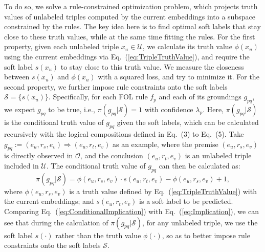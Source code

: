 \documentclass[letterpaper]{article} \usepackage{aaai18}  \usepackage{times}  \usepackage{helvet}  \usepackage{courier}  \usepackage{url}  \usepackage{graphicx}  \usepackage{amsmath}
\begin{document}
To do so, we solve a rule-constrained optimization problem, which projects truth values of unlabeled triples computed by the current embeddings into a subspace constrained by the rules. The key idea here is to find optimal soft labels that stay close to these truth values, while at the same time fitting the rules. For the first property, given each unlabeled triple $x_u\in\mathcal{U}$, we calculate its truth value $\phi(x_u)$ using the current embeddings via Eq.~(\ref{eq:TripleTruthValue}), and require the soft label $s(x_u)$ to stay close to this truth value. We measure the closeness between $s(x_u)$ and $\phi(x_u)$ with a squared loss, and try to minimize it. For the second property, we further impose rule constraints onto the soft labels $\mathcal{S}=\{s(x_u)\}$. Specifically, for each FOL rule $f_p$ and each of its groundings $g_{pq}$, we expect $g_{pq}$ to be true, i.e., $\pi(g_{pq}|\mathcal{S})\!=\!1$ with confidence $\lambda_p$. Here, $\pi(g_{pq}|\mathcal{S})$ is the conditional truth value of $g_{pq}$ given the soft labels, which can be calculated recursively with the logical compositions defined in Eq.~(3) to Eq.~(5). Take $g_{pq}:=(e_u, r_s, e_v) \Rightarrow (e_u, r_t, e_v)$ as an example, where the premise $(e_u, r_s, e_v)$ is directly observed in $\mathcal{O}$, and the conclusion $(e_u, r_t, e_v)$ is an unlabeled triple included in $\mathcal{U}$. The conditional truth value of $g_{pq}$ can then be calculated as:
\begin{equation}\label{eq:ConditionalImplication}
\pi(g_{pq}|\mathcal{S}) \!=\! \phi(e_u, r_s, e_v) \!\cdot\! s(e_u, r_t, e_v) \!-\! \phi(e_u, r_s, e_v) \!+\! 1, \!\!
\end{equation}
where $\phi(e_u, r_s, e_v)$ is a truth value defined by Eq.~(\ref{eq:TripleTruthValue}) with the current embeddings; and $s(e_u, r_t, e_v)$ is a soft label to be predicted. Comparing Eq.~(\ref{eq:ConditionalImplication}) with Eq.~(\ref{eq:Implication}), we can see that during the calculation of $\pi(g_{pq}|\mathcal{S})$, for any unlabeled triple, we use the soft label $s(\cdot)$ rather than the truth value $\phi(\cdot)$, so as to better impose rule constraints onto the soft labels $\mathcal{S}$.
\end{document}
